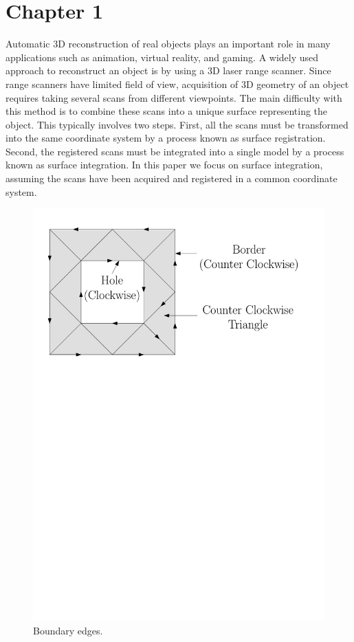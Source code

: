 \chapter{Chapter 1}
Automatic 3D reconstruction of real objects plays an important role in many applications such as animation, virtual reality, and gaming. A widely used approach to reconstruct an object is by using a 3D laser range scanner. Since range scanners have limited field of view, acquisition of 3D geometry of an object requires taking several scans from different viewpoints. The main difficulty with this method is to combine these scans into a unique surface representing the object. This typically involves two steps. First, all the scans must be transformed into the same coordinate system by a process known as surface registration. Second, the registered scans must be integrated into a single model by a process known as surface integration. In this paper we focus on surface integration, assuming the scans have been acquired and registered in a common coordinate system.

\begin{figure}[t]
    \centering
    \includegraphics[width=5in]{border}
    \caption[Boundary 2edges]{Boundary edges.}
    \label{fig:Ch2-border}
\end{figure}

